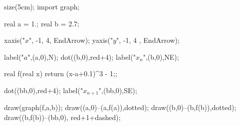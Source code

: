 size(5cm);
import graph;

real a = 1.;
real b = 2.7;

xaxis("$x$", -1, 4, EndArrow); 
yaxis("$y$", -1, 4 , EndArrow);

label("$a$",(a,0),N);
dot((b,0),red+4);
label("$x_n$",(b,0),NE);

real f(real x) { return (x-a+0.1)^3 - 1;};

dot((bb,0),red+4);
label("$x_{n+1}$",(bb,0),SE);

draw(graph(f,a,b));
draw((a,0)--(a,f(a)),dotted);
draw((b,0)--(b,f(b)),dotted);
draw((b,f(b))--(bb,0), red+1+dashed);